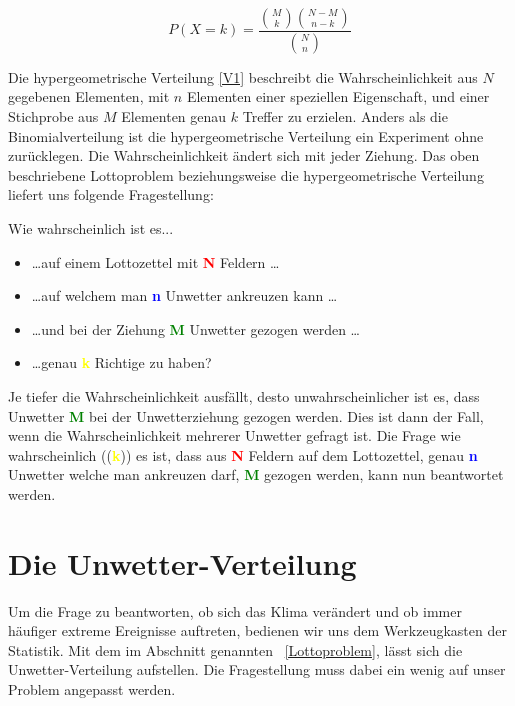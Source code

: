 \begin{refsection}
\begin{equation}
P(X = k) = 
\frac{\displaystyle \binom{M}{k} \binom{N-M}{n-k}}{\displaystyle \binom{N}{n} } 
\label {V1}
\end{equation}

Die hypergeometrische Verteilung \eqref{V1} beschreibt die Wahrscheinlichkeit aus $N$ gegebenen Elementen, mit $n$ Elementen einer speziellen Eigenschaft, und einer Stichprobe aus $M$ Elementen genau $k$ Treffer zu erzielen. 
Anders als die Binomialverteilung ist die hypergeometrische Verteilung ein Experiment ohne zurücklegen. Die Wahrscheinlichkeit ändert sich mit jeder Ziehung. 
%
Das oben beschriebene Lottoproblem beziehungsweise die hypergeometrische Verteilung liefert uns folgende Fragestellung:

Wie wahrscheinlich ist es...

\begin{itemize}
\item \dots auf einem Lottozettel mit \textcolor{red}{\textbf{N}} Feldern \dots
\item \dots auf welchem man \textcolor{blue}{\textbf{n}} Unwetter ankreuzen kann \dots
\item \dots und bei der Ziehung \textcolor{green}{\textbf{M}} Unwetter gezogen werden \dots
\item \dots genau \textcolor{yellow}{\textbf{k}} Richtige zu haben?
\end{itemize}

Je tiefer die Wahrscheinlichkeit ausfällt, desto unwahrscheinlicher ist es, dass Unwetter \textcolor{green}{\textbf{M}} bei der Unwetterziehung gezogen werden. Dies ist dann der Fall, wenn die Wahrscheinlichkeit mehrerer Unwetter gefragt ist. Die Frage wie wahrscheinlich ((\textcolor{yellow}{\textbf{k}})) es ist, dass aus \textcolor{red}{\textbf{N}} Feldern auf dem Lottozettel, genau \textcolor{blue}{\textbf{n}} Unwetter welche man ankreuzen darf, \textcolor{green}{\textbf{M}} gezogen werden, kann nun beantwortet werden.


\section{Die Unwetter-Verteilung} \label{UnwetterVert}
Um die Frage zu beantworten, ob sich das Klima verändert und ob immer häufiger extreme Ereignisse auftreten, bedienen wir uns dem Werkzeugkasten der Statistik. Mit dem im Abschnitt genannten ~\ref{Lottoproblem}, lässt sich die Unwetter-Verteilung aufstellen. Die Fragestellung muss dabei ein wenig auf unser Problem angepasst werden.


\end{refsection}
